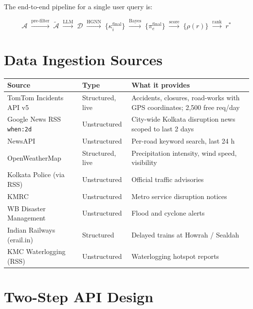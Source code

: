 \noindent
The end-to-end pipeline for a single user query is:

\begin{equation}
  \mathcal{A}
  \;\xrightarrow{\text{pre-filter}}\;
  \tilde{\mathcal{A}}
  \;\xrightarrow{\text{LLM}}\;
  \mathcal{D}
  \;\xrightarrow{\text{HGNN}}\;
  \{\kappa_i^{\text{final}}\}
  \;\xrightarrow{\text{Bayes}}\;
  \{\pi_e^{\text{final}}\}
  \;\xrightarrow{\text{score}}\;
  \{\rho(r)\}
  \;\xrightarrow{\text{rank}}\;
  r^*
  \label{eq:pipeline}
\end{equation}

\section{Data Ingestion Sources}

\begin{longtable}{p{4.0cm} p{2.6cm} p{6.4cm}}
\toprule
\textbf{Source} & \textbf{Type} & \textbf{What it provides} \\
\midrule
\endhead
TomTom Incidents API v5~\cite{tomtom2024}
  & Structured, live
  & Accidents, closures, road-works with GPS coordinates;
    2{,}500 free req/day \\[4pt]
Google News RSS \texttt{when:2d}
  & Unstructured
  & City-wide Kolkata disruption news scoped to last 2 days \\[4pt]
NewsAPI
  & Unstructured
  & Per-road keyword search, last 24 h \\[4pt]
OpenWeatherMap~\cite{openweathermap2024}
  & Structured, live
  & Precipitation intensity, wind speed, visibility \\[4pt]
Kolkata Police (via RSS)
  & Unstructured
  & Official traffic advisories \\[4pt]
KMRC~\cite{kmrc2024}
  & Unstructured
  & Metro service disruption notices \\[4pt]
WB Disaster Management
  & Unstructured
  & Flood and cyclone alerts \\[4pt]
Indian Railways (erail.in)
  & Structured
  & Delayed trains at Howrah / Sealdah \\[4pt]
KMC Waterlogging (RSS)
  & Unstructured
  & Waterlogging hotspot reports \\
\bottomrule
\end{longtable}

\section{Two-Step API Design}

